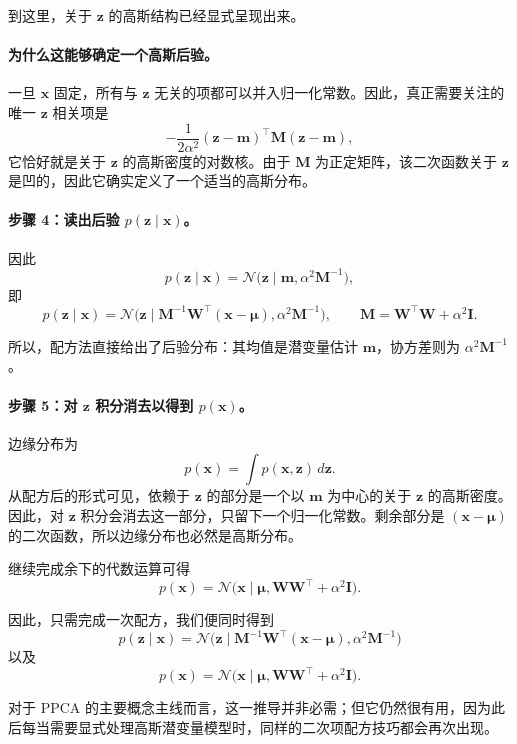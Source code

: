 到这里，关于 \(\mathbf{z}\) 的高斯结构已经显式呈现出来。

\paragraph{为什么这能够确定一个高斯后验。}
一旦 \(\mathbf{x}\) 固定，所有与 \(\mathbf{z}\) 无关的项都可以并入归一化常数。因此，真正需要关注的唯一 \(\mathbf{z}\) 相关项是
\[
-\frac{1}{2\alpha^2}(\mathbf{z}-\mathbf{m})^\top\mathbf{M}(\mathbf{z}-\mathbf{m}),
\]
它恰好就是关于 \(\mathbf{z}\) 的高斯密度的对数核。由于 \(\mathbf{M}\) 为正定矩阵，该二次函数关于 \(\mathbf{z}\) 是凹的，因此它确实定义了一个适当的高斯分布。

\paragraph{步骤 4：读出后验 \(p(\mathbf{z}\mid \mathbf{x})\)。}
因此
\[
p(\mathbf{z}\mid \mathbf{x})
=
\mathcal{N}\!\bigl(
\mathbf{z}\mid
\mathbf{m},
\alpha^2\mathbf{M}^{-1}
\bigr),
\]
即
\[
p(\mathbf{z}\mid \mathbf{x})
=
\mathcal{N}\!\bigl(
\mathbf{z}\mid
\mathbf{M}^{-1}\mathbf{W}^\top(\mathbf{x}-\boldsymbol{\mu}),
\alpha^2\mathbf{M}^{-1}
\bigr),
\qquad
\mathbf{M}=\mathbf{W}^\top\mathbf{W}+\alpha^2\mathbf{I}.
\]

所以，配方法直接给出了后验分布：其均值是潜变量估计 \(\mathbf{m}\)，协方差则为 \(\alpha^2\mathbf{M}^{-1}\)。

\paragraph{步骤 5：对 \(\mathbf{z}\) 积分消去以得到 \(p(\mathbf{x})\)。}
边缘分布为
\[
p(\mathbf{x})
=
\int p(\mathbf{x},\mathbf{z})\,d\mathbf{z}.
\]
从配方后的形式可见，依赖于 \(\mathbf{z}\) 的部分是一个以 \(\mathbf{m}\) 为中心的关于 \(\mathbf{z}\) 的高斯密度。因此，对 \(\mathbf{z}\) 积分会消去这一部分，只留下一个归一化常数。剩余部分是 \((\mathbf{x}-\boldsymbol{\mu})\) 的二次函数，所以边缘分布也必然是高斯分布。

继续完成余下的代数运算可得
\[
p(\mathbf{x})
=
\mathcal{N}\!\bigl(
\mathbf{x}\mid
\boldsymbol{\mu},
\mathbf{W}\mathbf{W}^\top+\alpha^2\mathbf{I}
\bigr).
\]

\bigskip
因此，只需完成一次配方，我们便同时得到
\[
p(\mathbf{z}\mid \mathbf{x})
=
\mathcal{N}\!\bigl(
\mathbf{z}\mid
\mathbf{M}^{-1}\mathbf{W}^\top(\mathbf{x}-\boldsymbol{\mu}),
\alpha^2\mathbf{M}^{-1}
\bigr)
\]
以及
\[
p(\mathbf{x})
=
\mathcal{N}\!\bigl(
\mathbf{x}\mid
\boldsymbol{\mu},
\mathbf{W}\mathbf{W}^\top+\alpha^2\mathbf{I}
\bigr).
\]

对于 PPCA 的主要概念主线而言，这一推导并非必需；但它仍然很有用，因为此后每当需要显式处理高斯潜变量模型时，同样的二次项配方技巧都会再次出现。
